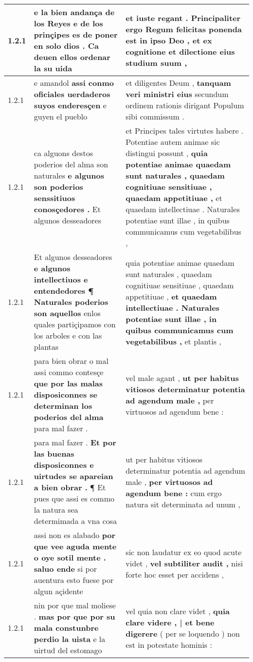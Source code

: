 \begin{tabular}{|p{1cm}|p{6.5cm}|p{6.5cm}|}
1.2.1 & e la bien andança de los Reyes \textbf{ e de los prinçipes es de poner en solo dios . } Ca deuen ellos ordenar la su uida & et iuste regant . \textbf{ Principaliter ergo Regum felicitas ponenda est in ipso Deo , } et ex cognitione et dilectione eius studium suum , \\\hline
1.2.1 & e amandol \textbf{ assi conmo oficiales uerdaderos suyos enderesçen } e guyen el pueblo & et diligentes Deum , \textbf{ tanquam veri ministri eius } secundum ordinem rationis dirigant Populum sibi commissum . \\\hline
1.2.1 & ca alguons destos poderios del alma son naturales \textbf{ e algunos son poderios senssitiuos conosçedores . } Et algunos desseadores & et Principes tales virtutes habere . Potentiae autem animae sic distingui possunt , \textbf{ quia potentiae animae quaedam sunt naturales , quaedam cognitiuae sensitiuae , quaedam appetitiuae , } et quaedam intellectiuae . Naturales potentiae sunt illae , in quibus communicamus cum vegetabilibus , \\\hline
1.2.1 & Et algunos desseadores \textbf{ e algunos intellectiuos e entendedores ¶ Naturales poderios son aquellos } enlos quales partiçipamos con los arboles e con las plantas & quia potentiae animae quaedam sunt naturales , quaedam cognitiuae sensitiuae , quaedam appetitiuae , \textbf{ et quaedam intellectiuae . Naturales potentiae sunt illae , in quibus communicamus cum vegetabilibus , } et plantis , \\\hline
1.2.1 & para bien obrar o mal assi commo contesçe \textbf{ que por las malas disposiconnes se determinan los poderios del alma } para mal fazer . & vel male agant , \textbf{ ut per habitus vitiosos determinatur potentia ad agendum male , } per virtuosos ad agendum bene : \\\hline
1.2.1 & para mal fazer . \textbf{ Et por las buenas disposiconnes e uirtudes se apareian a bien obrar . } ¶ Et pues que assi es commo la natura sea determimada a vna cosa & ut per habitus vitiosos determinatur potentia ad agendum male , \textbf{ per virtuosos ad agendum bene : } cum ergo natura sit determinata ad unum , \\\hline
1.2.1 & assi non es alabado \textbf{ por que vee aguda mente o oye sotil mente . saluo ende } si por auentura esto fuese por algun açidente & sic non laudatur ex eo quod acute videt , \textbf{ vel subtiliter audit , } nisi forte hoc esset per accidens , \\\hline
1.2.1 & nin por que mal moliese . \textbf{ mas por que por su mala constunbre perdio la uista } e la uirtud del estomago & vel quia non clare videt , \textbf{ quia clare videre , | et bene digerere } ( per se loquendo ) non est in potestate hominis : \\\hline

\end{tabular}
